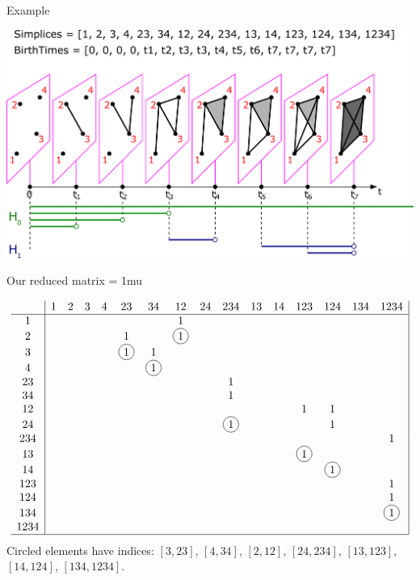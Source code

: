 \documentclass[10pt,xcolor={usenames}]{beamer}
\newcommand*\circled[1]{\tikz[baseline=(char.base)]{
            \node[shape=circle,draw,inner sep=2pt] (char) {#1};}}
\begin{document}
\begin{frame}{Example}

\begin{center}
\includegraphics[scale=0.2]{pictures/filtration7.pdf}
\end{center}

\end{frame}

\begin{frame}{Our reduced matrix}
\footnotesize
\setlength{\arraycolsep}{2.5pt}
\medmuskip = 1mu %

\[
\begin{array}{c|ccccccccccccccc|}
& 1 & 2 & 3 & 4 & 23 & 34 & 12 & 24 & 234 & 13 & 14 & 123 & 124 & 134 & 1234\\
\hline
1   &&&&&&&1&&&&&&&& \\
2   &&&&&1&&\circled{1}&&&&&&&& \\
3   &&&&&\circled{1}&1&&&&&&&&& \\
4   &&&&&&\circled{1}&&&&&&&&& \\
23  &&&&&&&&&1&&&&&&\\
34  &&&&&&&&&1&&&&&& \\
12  &&&&&&&&&&&&1&1&& \\
24  &&&&&&&&&\circled{1}&&&&1&& \\
234 &&&&&&&&&&&&&&&1 \\
13  &&&&&&&&&&&&\circled{1}&&& \\
14  &&&&&&&&&&&&&\circled{1}&& \\
123 &&&&&&&&&&&&&&&1 \\
124 &&&&&&&&&&&&&&&1 \\
134 &&&&&&&&&&&&&&&\circled{1} \\
1234&&&&&&&&&&&&&&& \\
\hline
\end{array}
\]
\small
Circled elements have indices: $[3,23]$, $[4,34]$, $[2,12]$, $[24,234]$, $[13,123]$, $[14,124]$, $[134,1234]$.

\end{frame}
\end{document}
